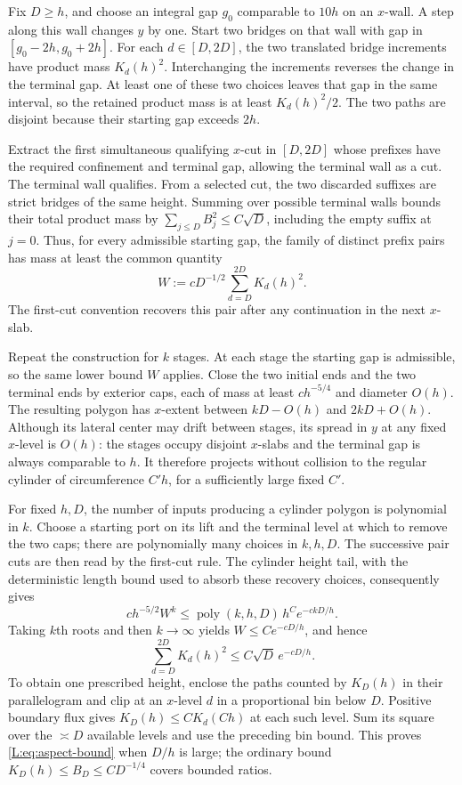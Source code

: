 Fix $D\ge h$, and choose an integral gap $g_0$ comparable to $10h$
on an $x$-wall.  A step along this wall changes $y$ by one.  Start two
bridges on that wall with gap in $[g_0-2h,g_0+2h]$.  For each
$d\in[D,2D]$, the two translated bridge increments have product mass
$K_d(h)^2$.  Interchanging the increments reverses the change in the
terminal gap.  At least one of these two choices leaves that gap in
the same interval, so the retained product mass is at least
$K_d(h)^2/2$.  The two paths are disjoint because their starting gap
exceeds $2h$.

Extract the first simultaneous qualifying $x$-cut in $[D,2D]$
whose prefixes have the required confinement and terminal gap, allowing
the terminal wall as a cut.  The terminal wall qualifies.  From a selected cut, the two discarded
suffixes are strict bridges of the same height.  Summing over possible
terminal walls bounds their total product mass by
$\sum_{j\le D}B_j^2\le C\sqrt D$, including the empty suffix at $j=0$.
Thus, for every admissible starting gap, the family of distinct
prefix pairs has mass at least the common quantity
\[
 W:=cD^{-1/2}\sum_{d=D}^{2D}K_d(h)^2.
\]
The first-cut convention recovers this pair after any continuation in
the next $x$-slab.

Repeat the construction for $k$ stages.  At each stage the starting
gap is admissible, so the same lower bound $W$ applies.  Close the two
initial ends and the two terminal ends by exterior caps, each of
mass at least $ch^{-5/4}$ and diameter $O(h)$.  The resulting polygon
has $x$-extent between $kD-O(h)$ and $2kD+O(h)$.  Although its lateral
center may drift between stages, its spread in $y$ at any fixed
$x$-level is $O(h)$: the stages occupy disjoint $x$-slabs and the
terminal gap is always comparable to $h$.  It therefore projects
without collision to the regular cylinder of circumference $C'h$,
for a sufficiently large fixed $C'$.

For fixed $h,D$, the number of inputs producing a cylinder polygon is
polynomial in $k$.  Choose a starting port on its lift and the terminal
level at which to remove the two caps; there are polynomially many
choices in $k,h,D$.  The successive pair cuts are then read by the
first-cut rule.  The cylinder height tail, with the deterministic
length bound used to absorb these recovery choices, consequently gives
\[
 c h^{-5/2}W^k
 \le \operatorname{poly}(k,h,D)\,h^C e^{-ckD/h}.
\]
Taking $k$th roots and then $k\to\infty$ yields $W\le C e^{-cD/h}$,
and hence
\[
 \sum_{d=D}^{2D}K_d(h)^2\le C\sqrt D\,e^{-cD/h}.
\]
To obtain one prescribed height, enclose the paths counted by $K_D(h)$
in their parallelogram and clip at an $x$-level $d$ in a proportional
bin below $D$.  Positive boundary flux gives
$K_D(h)\le C K_d(Ch)$ at each such level.  Sum its square over the
$\asymp D$ available levels and use the preceding bin bound.  This
proves \eqref{L:eq:aspect-bound} when $D/h$ is large; the ordinary
bound $K_D(h)\le B_D\le CD^{-1/4}$ covers bounded ratios.


